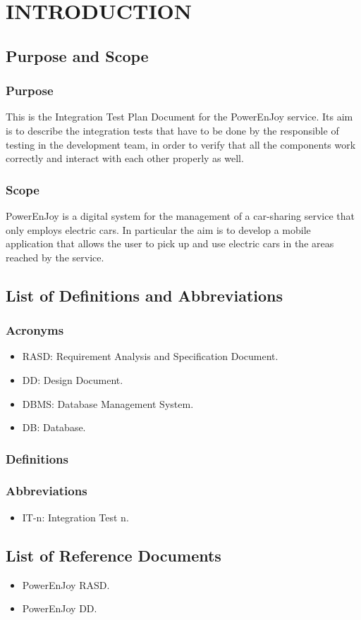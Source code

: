\section{INTRODUCTION}
\subsection{Purpose and Scope}
\subsubsection{Purpose}

This is the Integration Test Plan Document for the PowerEnJoy service. Its aim is to describe the integration tests that have to be done by the responsible of testing in the development team, in order to verify that all the components work correctly and interact with each other properly as well.
 
\subsubsection{Scope}
PowerEnJoy is a digital system for the management of a car-sharing service that only employs electric cars. In particular the aim is to develop a mobile application that allows the user to pick up and use electric cars in the areas reached by the service.

\subsection{List of Definitions and Abbreviations} 
\subsubsection{Acronyms}
\begin{itemize}
\item RASD: Requirement Analysis and Specification Document.
\item DD: Design Document.
\item DBMS: Database Management System.
\item DB: Database.

\end{itemize}
\subsubsection{Definitions}

\subsubsection{Abbreviations}
\begin{itemize}
\item IT-n: Integration Test n.
\end{itemize}



\subsection{List of Reference Documents}
\begin{itemize}
	\item PowerEnJoy RASD.	
	\item PowerEnJoy DD.
\end{itemize}

